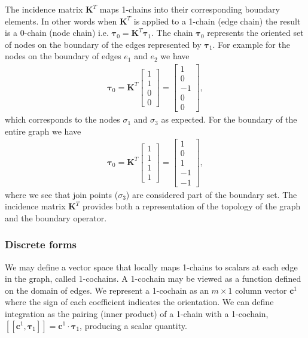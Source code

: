 \documentclass[12pt]{article}
\begin{document}
The incidence matrix $\mathbf{K}^T$ maps 1-chains into their corresponding boundary elements. In other words when $\mathbf{K}^T$ is applied to a 1-chain (edge chain) the result is a 0-chain (node chain) i.e. $\mathbf{\tau}_0 = \mathbf{K}^T \mathbf{\tau}_1$. The chain $\mathbf{\tau}_0$ represents the oriented set of nodes on the boundary of the edges represented by $\mathbf{\tau}_1$. For example for the nodes on the boundary of edges $e_1$ and $e_2$ we have
\begin{align*}
\mathbf{\tau}_0 = \mathbf{K}^T \begin{bmatrix}
1 \\ 1 \\ 0 \\ 0
\end{bmatrix} = \begin{bmatrix}
1 \\ 0 \\ -1 \\ 0 \\ 0
\end{bmatrix},
\end{align*}
which corresponds to the nodes $\sigma_1$ and $\sigma_3$ as expected. For the boundary of the entire graph we have 
\begin{align*}
\mathbf{\tau}_0 = \mathbf{K}^T \begin{bmatrix}
1 \\ 1 \\ 1 \\ 1
\end{bmatrix} = \begin{bmatrix}
1 \\ 0 \\ 1 \\ -1 \\ -1
\end{bmatrix},
\end{align*}
where we see that join points ($\sigma_3$) are considered part of the boundary set. The incidence matrix $\mathbf{K}^T$ provides both a representation of the topology of the graph and the boundary operator. 

\subsubsection{Discrete forms}

We may define a vector space that locally maps 1-chains to scalars at each edge in the graph, called 1-cochains. A 1-cochain may be viewed as a function defined on the domain of edges. We represent a 1-cochain as an $m \times 1$ column vector $\mathbf{c}^1$ where the sign of each coefficient indicates the orientation. We can define integration as the pairing (inner product) of a 1-chain with a 1-cochain,
$[\![ \mathbf{c}^1, \mathbf{\tau}_1 ]\!] = \mathbf{c}^1 \cdot \mathbf{\tau}_1$, producing a scalar quantity. 
\end{document}
